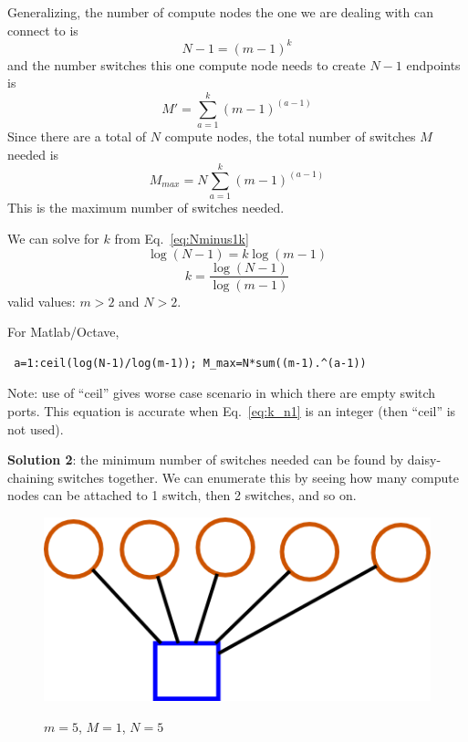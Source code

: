\documentclass[pdftex]{article}
\begin{document}
Generalizing, the number of compute nodes the one we are dealing with can connect to is
\begin{equation}
 N-1=(m-1)^k
 \label{eq:Nminus1k}
\end{equation}
and the number switches this one compute node needs to create $N-1$ endpoints is
\begin{equation}
 M'=\sum_{a=1}^{k} (m-1)^{(a-1)}
\end{equation}
Since there are a total of $N$ compute nodes, the total number of switches $M$ needed is
\begin{equation}
\boxed{
 M_{max}=N\sum_{a=1}^{k} (m-1)^{(a-1)}
 }
\end{equation}
This is the maximum number of switches needed.

We can solve for $k$ from Eq.~\ref{eq:Nminus1k}
\begin{equation}
 \log(N-1)=k\log(m-1)
\end{equation}
\begin{equation}
 k=\frac{\log(N-1)}{\log(m-1)}
 \label{eq:k_n1}
\end{equation}
valid values: $m>2$ and $N>2$.

For Matlab/Octave,
\begin{verbatim}
 a=1:ceil(log(N-1)/log(m-1)); M_max=N*sum((m-1).^(a-1))
\end{verbatim}
Note: use of ``ceil'' gives worse case scenario in which there are empty switch ports. This equation is accurate when Eq.~\ref{eq:k_n1} is an integer (then ``ceil'' is not used).

\textbf{Solution 2}: the minimum number of switches needed can be found by daisy-chaining switches together. We can enumerate this by seeing how many compute nodes can be attached to 1 switch, then 2 switches, and so on. 

\begin{figure}[h!]
\begin{center}
\includegraphics[scale=0.3]{pictures/N5_n1_M1_m5}
\label{fig:neq15}
 \caption{$m=5$, $M=1$, $N=5$}
\end{center}
\end{figure}
\end{document}
